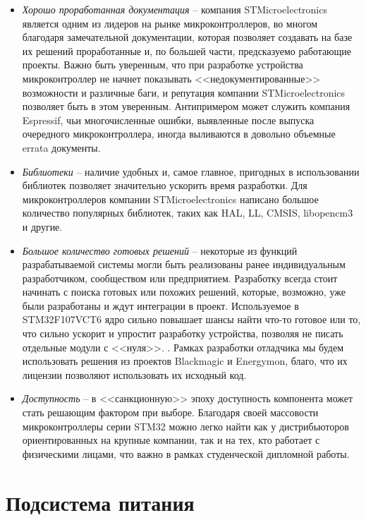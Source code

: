 \begin{itemize}
    \item \textit{Хорошо проработанная документация} -- компания
     STMicroelectronics является одним из лидеров на рынке микроконтроллеров, во многом благодаря
     замечательной документации, которая позволяет создавать на базе их решений проработанные
     и, по большей части, предсказуемо работающие проекты. Важно быть уверенным, что при разработке
     устройства микроконтроллер не начнет показывать <<недокументированные>> возможности и
     различные баги, и репутация компании STMicroelectronics позволяет быть в этом
     уверенным. Антипримером может служить компания Espressif, чьи многочисленные ошибки,
     выявленные после выпуска очередного микроконтроллера, иногда выливаются в довольно
     объемные errata документы.
    \item \textit{Библиотеки} -- наличие удобных и, самое главное, пригодных в использовании 
     библиотек позволяет значительно ускорить время разработки. Для микроконтроллеров
     компании STMicroelectronics написано большое количество популярных библиотек, таких
     как HAL, LL, CMSIS, libopencm3 и другие.
    \item \textit{Большое количество готовых решений} -- некоторые из функций разрабатываемой
     системы могли быть реализованы ранее индивидуальным разработчиком, 
     сообществом или предприятием. Разработку всегда стоит начинать с поиска готовых или похожих 
     решений, которые, возможно, уже были разработаны и ждут интеграции в проект. Используемое
     в STM32F107VCT6 ядро сильно повышает шансы найти что-то готовое или то, что сильно 
     ускорит и упростит разработку устройства, позволяя не писать отдельные модули с <<нуля>>.
     \cite{Lakamera:embed}. Рамках разработки отладчика мы будем использовать решения из проектов 
     Blackmagic и Energymon, благо, что их лицензии позволяют использовать их исходный код.
    \item \textit{Доступность} -- в <<санкционную>> эпоху доступность компонента может стать 
     решающим фактором при выборе. Благодаря своей массовости микроконтроллеры серии STM32 
     можно легко найти как у дистрибьюторов ориентированных на крупные компании, так и на тех,
     кто работает с физическими лицами, что важно в рамках студенческой дипломной работы.
\end{itemize}

\section{Подсистема питания}
\hspace{1cm} 

